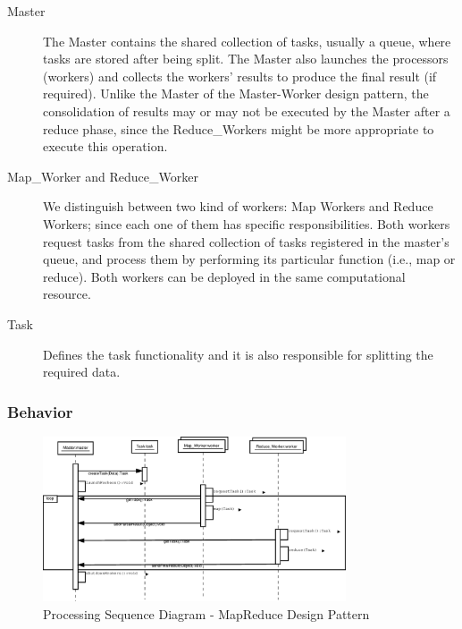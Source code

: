 \begin{description}
	
	\item[Master]
	The Master contains the shared collection of tasks, usually a queue, where tasks are stored after being split. The Master also launches the processors (workers) and collects the workers' results to produce the final result (if required). Unlike the Master of the Master-Worker design pattern, the consolidation of results may or may not be executed by the Master after a reduce phase, since the Reduce\_Workers might be more appropriate to execute this operation.
	
	\item[Map\_Worker and Reduce\_Worker]
	
	We distinguish between two kind of workers: Map Workers and Reduce Workers; since each one of them has specific responsibilities. Both workers request tasks from the shared collection of tasks registered in the master's queue, and process them by performing its particular function (i.e., map or reduce). Both workers can be deployed in the same computational resource. 
	
	\item[Task]
	Defines the task functionality and it is also responsible for splitting  the required data.
	
\end{description}

\subsubsection{Behavior}

\begin{figure}
	\centering
	\includegraphics*[width=0.8\textwidth, keepaspectratio=false]{fig/image28.eps}
	\caption{Processing Sequence Diagram - MapReduce Design Pattern}
	\label{fig:seq_diagram_map_reduce}
\end{figure}

